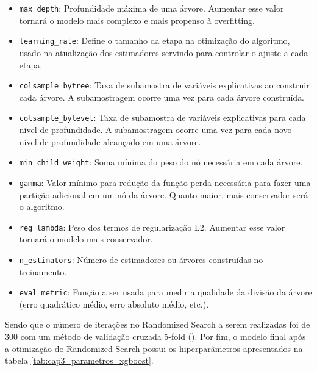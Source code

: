 \begin{itemize}
	\item \verb|max_depth|: Profundidade máxima de uma árvore. Aumentar esse valor tornará o modelo mais complexo e mais propenso à overfitting.
	\item \verb|learning_rate|: Define o tamanho da etapa na otimização do algoritmo, usado na atualização dos estimadores servindo para controlar o ajuste a cada etapa.
	\item \verb|colsample_bytree|: Taxa de subamostra de variáveis explicativas ao construir cada árvore. A subamostragem ocorre uma vez para cada árvore construída.
	\item \verb|colsample_bylevel|: Taxa de subamostra de variáveis explicativas para cada nível de profundidade. A subamostragem ocorre uma vez para cada novo nível de profundidade alcançado em uma árvore.
	\item \verb|min_child_weight|: Soma mínima do peso do nó necessária em cada árvore.
	\item \verb|gamma|: Valor mínimo para redução da função perda necessária para fazer uma partição adicional em um nó da árvore. Quanto maior, mais conservador será o algoritmo.
	\item \verb|reg_lambda|: Peso dos termos de regularização L2. Aumentar esse valor tornará o modelo mais conservador.
	\item \verb|n_estimators|: Número de estimadores ou árvores construídas no treinamento.
	\item \verb|eval_metric|: Função a ser usada para medir a qualidade da divisão da árvore (erro quadrático médio, erro absoluto médio, etc.).
\end{itemize}

Sendo que o número de iterações no Randomized Search a serem realizadas foi de 300 com um método de validação cruzada 5-fold (\citet{Kohavi1995}). Por fim, o modelo final após a otimização do Randomized Search possui os hiperparâmetros apresentados na tabela \ref{tab:cap3_parametros_xgboost}.


